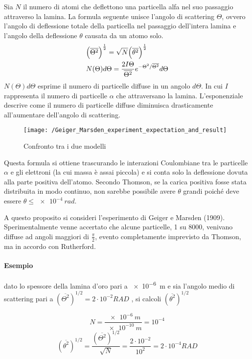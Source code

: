 Sia $N$ il numero di atomi che deflettono una particella alfa nel suo passaggio attraverso la lamina.
La formula seguente unisce l'angolo di scattering $\Theta$, ovvero l'angolo di deflessione totale della particella nel passaggio dell'intera lamina e l'angolo della deflessione $\theta$ causata da un atomo solo.
\begin{equation}
\begin{split}
& \Bigl(  \overline{ \Theta^2 }  \Bigr)^{ \frac{ 1}{2 } } = \sqrt{N} \Bigl(  \overline{ \theta^2 }  \Bigr)^{ \frac{ 1}{2 } } \\ 
& N(\Theta)d\Theta = \frac{2 I \Theta}{\overline{\Theta^2}} e^{-{\Theta^2}/{\overline{\Theta^2}}} d\Theta
\end{split}
\end{equation}
$N(\Theta)d\Theta$ esprime il numero di particelle diffuse in un angolo $d\Theta$. 
In cui $I$ rappresenta il numero di particelle $\alpha$ che attraversano la lamina.
L'esponenziale descrive come il numero di particelle diffuse diminuisca drasticamente all'aumentare dell'angolo di scattering.

\begin{figure}[h]
\centering
\texttt{[image: /Geiger\_Marsden\_experiment\_expectation\_and\_result]}
\caption{ Confronto tra i due modelli }
\end{figure}

Questa formula si ottiene trascurando le interazioni Coulombiane tra le particelle $\alpha$ e gli elettroni (la cui massa è assai piccola) e si conta solo la deflessione dovuta alla parte positiva dell'atomo.
Secondo Thomson, se la carica positiva fosse stata distribuita in modo continuo, non sarebbe possibile avere $\theta$ grandi poiché deve essere $\theta \le \SI{e-4}{rad}$.

A questo proposito si consideri l'esperimento di Geiger e Marsden (1909).
Sperimentalmente venne accertato che alcune particelle, 1 su 8000, venivano diffuse ad angoli maggiori di $\frac{ \pi}{2 }$, evento completamente imprevisto da Thomson, ma in accordo con Rutherford.

\paragraph{Esempio} 
dato lo spessore della lamina d'oro pari a \SI{e-6}{m} e sia l'angolo medio di scattering pari a $(\overline{\Theta^2})^{1/2} = 2\cdot 10^{-2} RAD$ , si calcoli $(\overline{\theta^2})^{1/2}$

$$ N = \frac{\SI{e-6}{m}}{\SI{e-10}{m}} = 10^{-4} $$
$$(\overline{\theta^2})^{1/2} = \frac{(\overline{\Theta^2})^{1/2}}{\sqrt{N}} = \frac{2\cdot 10^{-2}}{10^{2}} = 2 \cdot 10^{-4} RAD $$


